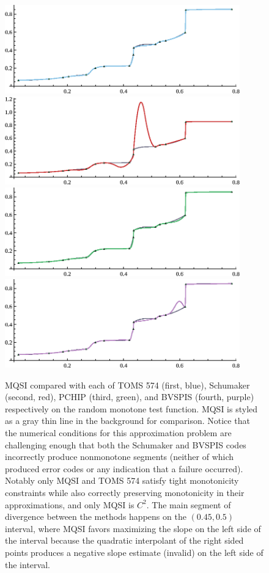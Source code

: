 \begin{figure}
  \centering
\includegraphics[width=4in]{vis/comparisons/random-monotone/1-toms574.eps}
\includegraphics[width=4in]{vis/comparisons/random-monotone/2-schumaker.eps}
\includegraphics[width=4in]{vis/comparisons/random-monotone/3-pchip.eps}
\includegraphics[width=4in]{vis/comparisons/random-monotone/4-bvspis.eps}
\caption{ %
{\ttVIII MQSI} compared with each of TOMS 574 (first, blue), Schumaker
(second, red), {\ttVIII PCHIP} (third, green), and {\ttVIII BVSPIS}
(fourth, purple) respectively on the {\itVIII random monotone} test
function. {\ttVIII MQSI} is styled as a gray thin line in the
background for comparison. Notice that the numerical conditions for
this approximation problem are challenging enough that both the
Schumaker and {\ttVIII BVSPIS} codes incorrectly produce nonmonotone
segments (neither of which produced error codes or any indication that
a failure occurred). Notably only {\ttVIII MQSI} and TOMS 574 satisfy
tight monotonicity constraints while also correctly preserving
monotonicity in their approximations, and only {\ttVIII MQSI} is
$C^2$. The main segment of divergence between the methods happens on
the $(0.45, 0.5)$ interval, where {\ttVIII MQSI} favors maximizing the
slope on the left side of the interval because the quadratic
interpolant of the right sided points produces a negative
slope estimate (invalid) on the left side of the interval.}
\end{figure}
